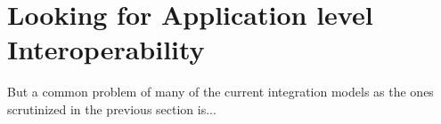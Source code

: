 \section{Looking for Application level Interoperability}
\label{sec:interoperability}

But a common problem of many of the current integration models as the ones scrutinized in the previous section is...


